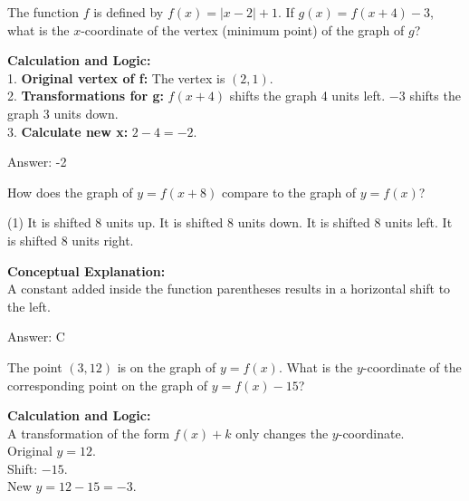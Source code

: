 \documentclass[11pt,paper=a4,answers]{exam}
\begin{document}
\begin{questions}
\question
The function $f$ is defined by $f(x) = |x-2| + 1$. If $g(x) = f(x+4) - 3$, what is the $x$-coordinate of the vertex (minimum point) of the graph of $g$?

\begin{solution}
\textbf{Calculation and Logic:} \\
1. \textbf{Original vertex of f:} The vertex is $(2, 1)$. \\
2. \textbf{Transformations for g:} $f(x+4)$ shifts the graph 4 units left. $-3$ shifts the graph 3 units down. \\
3. \textbf{Calculate new x:} $2 - 4 = -2$.

\vspace{25pt}

Answer: \colorbox{yellow!100}{-2}
\end{solution}

\vspace{40pt}

\question
How does the graph of $y = f(x+8)$ compare to the graph of $y = f(x)$?
\begin{tasks}(1)
    \task It is shifted 8 units up.
    \task It is shifted 8 units down.
    \task It is shifted 8 units left.
    \task It is shifted 8 units right.
\end{tasks}

\begin{solution}
\textbf{Conceptual Explanation:} \\
A constant added inside the function parentheses results in a horizontal shift to the left.

\vspace{25pt}

Answer: \colorbox{yellow!100}{C}
\end{solution}

\vspace{40pt}

\question
The point $(3, 12)$ is on the graph of $y = f(x)$. What is the $y$-coordinate of the corresponding point on the graph of $y = f(x) - 15$?

\begin{solution}
\textbf{Calculation and Logic:} \\
A transformation of the form $f(x) + k$ only changes the $y$-coordinate. \\
Original $y = 12$. \\
Shift: $-15$. \\
New $y = 12 - 15 = -3$.


\end{solution}
\end{questions}
\end{document}
